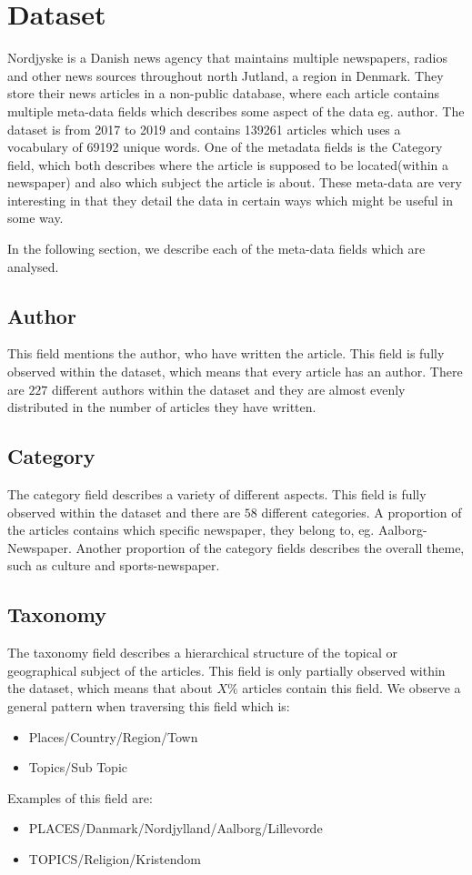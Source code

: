 \section{Dataset}
Nordjyske is a Danish news agency that maintains multiple newspapers, radios and other news sources throughout north Jutland, a region in Denmark.
They store their news articles in a non-public database, where each article contains multiple meta-data fields which describes some aspect of the data eg. author.
The dataset is from 2017 to 2019 and contains 139261 articles which uses a vocabulary of 69192 unique words.
One of the metadata fields is the Category field, which both describes where the article is supposed to be located(within a newspaper) and also which subject the article is about.
These meta-data are very interesting in that they detail the data in certain ways which might be useful in some way.

In the following section, we describe each of the meta-data fields which are analysed.

\subsection{Author}
This field mentions the author, who have written the article.
This field is fully observed within the dataset, which means that every article has an author.
There are $227$ different authors within the dataset and they are almost evenly distributed in the number of articles they have written.

\subsection{Category}
The category field describes a variety of different aspects. 
This field is fully observed within the dataset and there are $58$ different categories.
A proportion of the articles contains which specific newspaper, they belong to, eg. Aalborg-Newspaper.
Another proportion of the category fields describes the overall theme, such as culture and sports-newspaper.


\subsection{Taxonomy}
The taxonomy field describes a hierarchical structure of the topical or geographical subject of the articles.
This field is only partially observed within the dataset, which means that about $X\%$ articles contain this field.
We observe a general pattern when traversing this field which is:
\begin{itemize}
	\item Places/Country/Region/Town
	\item Topics/Sub Topic
\end{itemize}
Examples of this field are:
\begin{itemize}
	\item PLACES/Danmark/Nordjylland/Aalborg/Lillevorde
	\item TOPICS/Religion/Kristendom
\end{itemize}